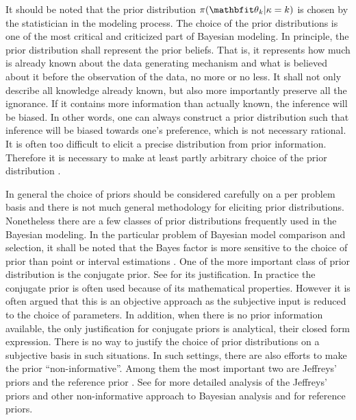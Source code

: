 It should be noted that the prior distribution $\pi(\bth_k|\kappa=k)$ is
chosen by the statistician in the modeling process. The choice of the prior
distributions is one of the most critical and criticized part of Bayesian
modeling. In principle, the prior distribution shall represent the prior
beliefs. That is, it represents how much is already known about the data
generating mechanism and what is believed about it before the observation of
the data, no more or no less. It shall not only describe all knowledge already
known, but also more importantly preserve all the ignorance. If it contains
more information than actually known, the inference will be biased. In other
words, one can always construct a prior distribution such that inference will
be biased towards one's preference, which is not necessary rational. It is
often too difficult to elicit a precise distribution from prior information.
Therefore it is necessary to make at least partly arbitrary choice of the
prior distribution \parencites{Robert2007}[][chap.~3]{Kass1995}.

In general the choice of priors should be considered carefully on a per
problem basis and there is not much general methodology for eliciting prior
distributions. Nonetheless there are a few classes of prior distributions
frequently used in the Bayesian modeling. In the particular problem of
Bayesian model comparison and selection, it shall be noted that the Bayes
factor is more sensitive to the choice of prior than point or interval
estimations \parencite{Kass1993, Kass1995}. One of the more important class of
prior distribution is the conjugate prior. See
\textcite[][chap.~5]{Bernardo2000} for its justification. In practice the
conjugate prior is often used because of its mathematical properties. However
it is often argued that this is an objective approach as the subjective input
is reduced to the choice of parameters. In addition, when there is no prior
information available, the only justification for conjugate priors is
analytical, their closed form expression. There is no way to justify the
choice of prior distributions on a subjective basis in such situations. In
such settings, there are also efforts to make the prior ``non-informative''.
Among them the most important two are Jeffreys' priors
\parencite{Jeffreys1946} and the reference prior \parencite{Bernardo1979}. See
\textcite{Kass1996} for more detailed analysis of the Jeffreys' priors and
other non-informative approach to Bayesian analysis and \textcite{Berger1989,
  Berger1992, Berger1992a} for reference priors.

